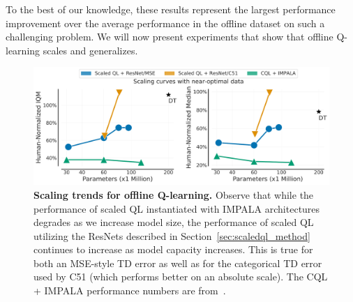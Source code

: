 To the best of our knowledge, these results represent the largest performance improvement over the average performance in the offline dataset on such a challenging problem. We will now present experiments that show that offline Q-learning scales and generalizes.

\begin{figure}[h]
\centering
\vspace{-0.2cm}
\includegraphics[width=0.75\linewidth]{chapters/scaled_ql/figures/scaling_plot_params_with_dt.pdf}
\vspace{-0.2cm}
\caption{\footnotesize{\textbf{Scaling trends for offline Q-learning.} Observe that while the performance of scaled QL instantiated with IMPALA architectures~\citep{espeholt2018impala} degrades as we increase model size, the performance of scaled QL utilizing the ResNets described in Section~\ref{sec:scaledql_method} continues to increase as model capacity increases. This is true for both an MSE-style TD error as well as for the categorical TD error used by C51 (which performs better on an absolute scale). The CQL + IMPALA performance numbers are from~\citep{lee2022multi}.}
}
\label{fig:scaling}
\vspace{-0.2cm}
\end{figure}

\vspace{-0.2cm}
